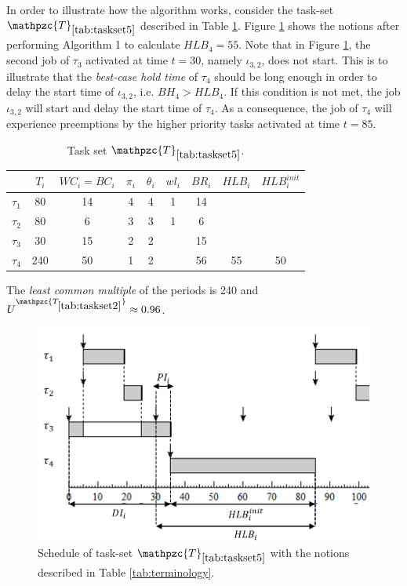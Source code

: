 \documentclass[fleqn]{article}
\begin{document}
In order to illustrate how the algorithm works, consider the task-set $\mathpzc{T}_{\ref{tab:taskset5}}$ described in Table \ref{tab:taskset5}. Figure \ref{fig:bcht_1} shows the notions after performing Algorithm 1 to calculate $HLB_4=55$. Note that in Figure \ref{fig:bcht_1}, the second job of $\tau_3$ activated at time $t=30$, namely $\iota_{3,2}$, does not start. This is to illustrate that the \textit{best-case hold time} of $\tau_4$ should be long enough in order to delay the start time of $\iota_{3,2}$, i.e. $BH_4 > HLB_4$. If this condition is not met, the job $\iota_{3,2}$ will start and delay the start time of $\tau_4$. As a consequence, the job of $\tau_4$ will experience preemptions by the higher priority tasks activated at time $t=85$.

\begin{table}[H]
	\center
	\caption{Task set $\mathpzc{T}_{\ref{tab:taskset5}}$.}
	\label{tab:taskset5}
	\begin{tabular}{c c c c c | c c c c}
		\hline 
		& $T_i$ & $WC_i=BC_i$ & $\pi_i$ & $\theta_i$ &  $wl_i$ & $BR_i$ & $HLB_i$ & $HLB^{init}_i$\\ 
		\hline 
		$\tau_1$& 80  & 14  & 4 & 4 &  1 & 14 & &\\
		$\tau_2$& 80  & 6   & 3 & 3 &  1 & 6  & &\\ 
		$\tau_3$& 30  & 15  & 2 & 2 &   & 15  & &\\ 
		$\tau_4$& 240 & 50  & 1 & 2 &   & 56  & 55& 50\\
		\hline 
	\end{tabular}
	\small
	\item The \textit{least common multiple} of the periods is 240 and $U^{\mathpzc{T_{\ref{tab:taskset2}}}} \approx 0.96$.
\end{table}

\begin{figure}[H]
	\centering
	\includegraphics[width=0.7\linewidth]{figures/bcht_1}
	\caption{Schedule of task-set $\mathpzc{T}_{\ref{tab:taskset5}}$ with the notions described in Table \ref{tab:terminology}.}
	\label{fig:bcht_1}
\end{figure}
\end{document}
